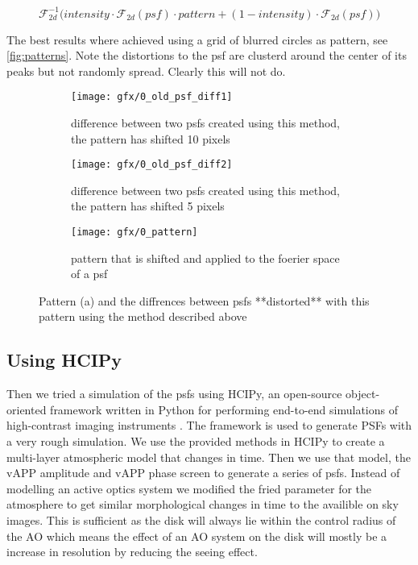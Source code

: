 \begin{equation}
\mathscr{F}_{2d}^{-1} \Big( intensity \cdot \mathscr{F}_{2d}(psf) \cdot pattern + (1-intensity) \cdot \mathscr{F}_{2d}(psf) \Big)
\end{equation}

The best results where achieved using a grid of blurred circles as pattern, see \autoref{fig:patterns}. Note the distortions to the psf are clusterd around the center of its peaks but not randomly spread. Clearly this will not do.

\begin{figure}[h!]
      \begin{subfigure}[t]{0.5\textwidth}
        \texttt{[image: gfx/0\_old\_psf\_diff1]}
        \caption{difference between two psfs created using this method, the pattern has shifted 10 pixels}
      \end{subfigure}%
      \begin{subfigure}[t]{0.5\textwidth}
        \texttt{[image: gfx/0\_old\_psf\_diff2]}
        \caption{difference between two psfs created using this method, the pattern has shifted 5 pixels}
      \end{subfigure}
      
      \begin{subfigure}[]{0.5\textwidth}
        \texttt{[image: gfx/0\_pattern]}
        \caption{pattern that is shifted and applied to the foerier space of a psf}
      \end{subfigure}
      
  \caption{Pattern (a) and the diffrences between psfs **distorted** with this pattern using the method described above}
  \label{fig:patterns}
\end{figure}

\subsection{Using HCIPy}
\label{sec:hcipy}
Then we tried a simulation of the psfs using \ac{HCIPy}, an open-source object-oriented framework written in Python for performing end-to-end simulations of high-contrast imaging instruments \cite{hcipy}. The framework is used to generate PSFs with a very rough simulation. We use the provided methods in \ac{HCIPy} to create a multi-layer atmospheric model that changes in time. Then we use that model, the \ac{vAPP} amplitude and \ac{vAPP} phase screen to generate a series of psfs. Instead of modelling an active optics system we modified the fried parameter for the atmosphere to get similar morphological changes in time to the availible on sky images. This is sufficient as the disk will always lie within the control radius of the \ac{AO} which means the effect of an \ac{AO} system on the disk will mostly be a increase in resolution by reducing the seeing effect.

